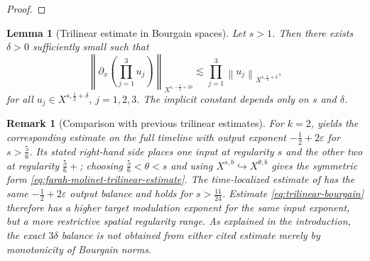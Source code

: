 \documentclass[12pt,oneside,reqno]{amsart}
\numberwithin{equation}{section}
\theoremstyle{plain}
\newtheorem{lemma}[theorem]{Lemma}
\newtheorem{remark}[theorem]{Remark}
\newcommand{\prc}[1]{%
    \left(#1\right)
}
\def\pt{\partial}
\newcommand{\xnorm}[3]{%
    \left\lVert #1\right\rVert_{X^{{#2},{#3}}}%
}
\begin{document}
\begin{proof}
\end{proof}







\begin{lemma}[Trilinear estimate in Bourgain spaces]
\label{lem:trilinear-bourgain}
Let $s>1$. Then there exists $\delta>0$ sufficiently small such that
\begin{equation}
\label{eq:trilinear-bourgain}
    \xnorm{
        \pt_x\prc{\prod_{j=1}^3u_j}
    }{s}{-\frac12+3\delta}
    \lesssim
    \prod_{j=1}^3
    \xnorm{u_j}{s}{\frac12+\delta},
\end{equation}
for all $u_j\in X^{s,\frac12+\delta}$, $j=1,2,3$.
The implicit constant depends only on $s$ and $\delta$.
\end{lemma}

\begin{remark}[Comparison with previous trilinear estimates]
For $k=2$, \cite[Proposition~3.3]{farah2024note} yields the corresponding
estimate on the full timeline with output exponent
$-\frac12+2\varepsilon$ for $s>\frac56$. Its stated right-hand side places
one input at regularity $s$ and the other two at regularity $\frac56+$;
choosing $\frac56<\theta<s$ and using
$X^{s,b}\hookrightarrow X^{\theta,b}$ gives the symmetric form
\eqref{eq:farah-molinet-trilinear-estimate}. The time-localized estimate of
\cite[Proposition~4.3]{nowickikoth2026strichartz} has the same
$-\frac12+2\varepsilon$ output balance and holds for
$s>\frac{11}{24}$. Estimate \eqref{eq:trilinear-bourgain} therefore has a
higher target modulation exponent for the same input exponent, but a more
restrictive spatial regularity range. As explained in the introduction, the
exact $3\delta$ balance is not obtained from either cited estimate merely by
monotonicity of Bourgain norms.
\end{remark}
\end{document}
